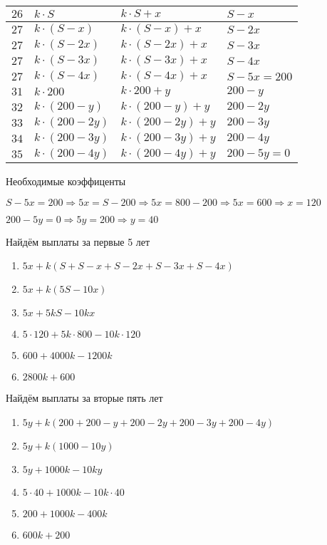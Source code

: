 \begin{tabular}{|l|l|l|l|}
    \hline
    $26$ & $k\cdot S$          & $k\cdot S + x$          & $S - x$        \\ \hline
    $27$ & $k\cdot (S - x)$    & $k\cdot (S - x) + x$    & $S - 2x$       \\ \hline
    $27$ & $k\cdot (S - 2x)$   & $k\cdot (S - 2x) + x$   & $S - 3x$       \\ \hline
    $27$ & $k\cdot (S - 3x)$   & $k\cdot (S - 3x) + x$   & $S - 4x$       \\ \hline
    $27$ & $k\cdot (S - 4x)$   & $k\cdot (S -4x) + x$    & $S - 5x = 200$ \\ \hline
    $31$ & $k\cdot 200$        & $k\cdot 200 + y$        & $200 - y$      \\ \hline
    $32$ & $k\cdot (200 - y)$  & $k\cdot (200 - y) + y$  & $200 - 2y$     \\ \hline
    $33$ & $k\cdot (200 - 2y)$ & $k\cdot (200 - 2y) + y$ & $200 - 3y$     \\ \hline
    $34$ & $k\cdot (200 - 3y)$ & $k\cdot (200 - 3y) + y$ & $200 - 4y$     \\ \hline
    $35$ & $k\cdot (200 - 4y)$ & $k\cdot (200 - 4y) + y$ & $200 - 5y = 0$ \\ \hline
\end{tabular}

Необходимые коэффиценты

$S - 5x = 200 \Rightarrow 5x = S - 200 \Rightarrow 5x = 800 - 200 \Rightarrow 5x = 600 \Rightarrow x = 120$

$200 - 5y = 0 \Rightarrow 5y = 200 \Rightarrow y = 40$

Найдём выплаты за первые 5 лет

\begin{enumerate}
    \item $5x + k(S + S - x + S - 2x + S - 3x + S - 4x)$
    \item $5x + k(5S - 10x)$
    \item $5x + 5kS - 10kx$
    \item $5\cdot 120 + 5k\cdot 800 - 10k\cdot 120$
    \item $600 + 4000k - 1200k$
    \item $2800k + 600$
\end{enumerate}

Найдём выплаты за вторые пять лет

\begin{enumerate}
    \item $5y + k(200 + 200 - y + 200 - 2y + 200 - 3y + 200 - 4y)$
    \item $5y + k(1000 - 10y)$
    \item $5y + 1000k - 10ky$
    \item $5\cdot 40 + 1000k - 10k \cdot 40$
    \item $200 + 1000k - 400k$
    \item $600k + 200$
\end{enumerate}

